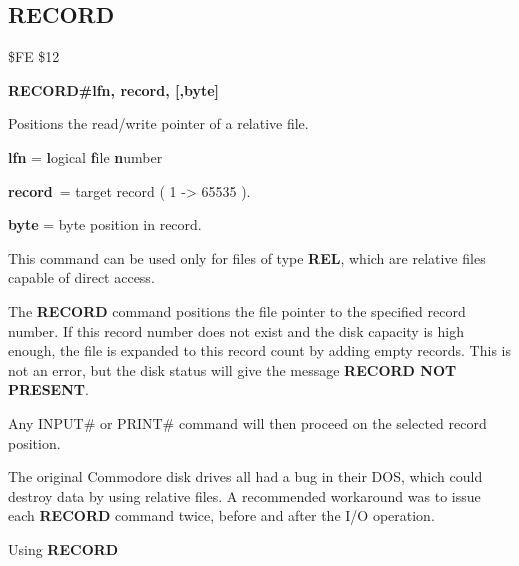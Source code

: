 
\newpage
\subsection{RECORD}
\begin{description}[leftmargin=3cm,style=nextline]
\item [Token:] \$FE \$12
\item [Format:] {\bf RECORD\#lfn, record, [,byte]}
\item [Usage:]  Positions the read/write pointer of a relative file.

                {\bf lfn} = {\bf l}ogical {\bf f}ile {\bf n}umber

                {\bf record} = target record ( 1 -> 65535 ).

                {\bf byte} = byte position in record.

                This command can be used only for files of
                type {\bf REL}, which are relative files capable
                of direct access.

               The {\bf RECORD} command positions the file pointer
               to the specified record number. If this record number
               does not exist and the disk capacity is high enough,
               the file is expanded to this record count by adding
               empty records. This is not an error, but the disk
               status will give the message {\bf RECORD NOT PRESENT}.

               Any INPUT\# or PRINT\# command will then proceed
               on the selected record position.

\item [Remarks:] The original Commodore disk drives all had a bug
               in their DOS, which could destroy data by using
               relative files. A recommended workaround was to
               issue each {\bf RECORD} command twice, before
               and after the I/O operation.

\item [Example:] Using {\bf RECORD}
\end{description}

